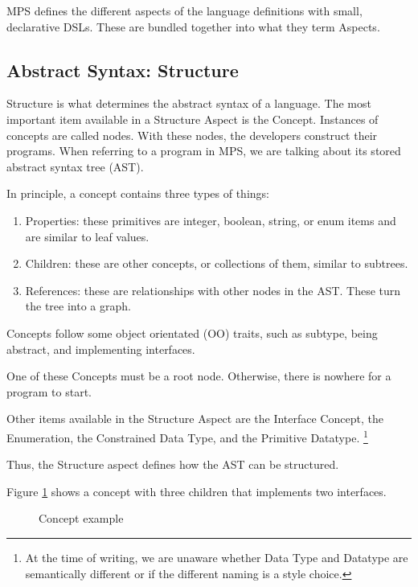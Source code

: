 MPS defines the different aspects of the language definitions with small, declarative DSLs.
These are bundled together into what they term Aspects.

\subsection{Abstract Syntax: Structure}
Structure is what determines the abstract syntax of a language.
The most important item available in a Structure Aspect is the Concept.
Instances of concepts are called nodes.
With these nodes, the developers construct their programs.
When referring to a program in MPS, we are talking about its stored abstract syntax tree (AST).

In principle, a concept contains three types of things:
\begin{enumerate}
    \setlength\itemsep{0em}
    \item Properties: these primitives are integer, boolean, string, or enum items and are similar to leaf values.
    \item Children: these are other concepts, or collections of them, similar to subtrees.
    \item References: these are relationships with other nodes in the AST. These turn the tree into a graph.
\end{enumerate}

Concepts follow some object orientated (OO) traits, such as subtype, being abstract, and implementing interfaces.

One of these Concepts must be a root node. 
Otherwise, there is nowhere for a program to start.

Other items available in the Structure Aspect are the Interface Concept, the Enumeration, the Constrained Data Type, and the Primitive Datatype.
\footnote{At the time of writing, we are unaware whether Data Type and Datatype are semantically different or if the different naming is a style choice.}

Thus, the Structure aspect defines how the AST can be structured.

Figure \ref{fig:concept_example} shows a concept with three children that implements two interfaces.

\begin{figure}[h]
    \centering
    \caption{Concept example}
    \label{fig:concept_example}
\end{figure}
 

